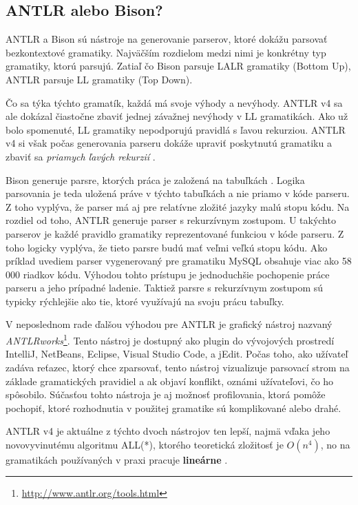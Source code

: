 \subsection{ANTLR alebo Bison?}
ANTLR a Bison sú nástroje na generovanie parserov, ktoré dokážu parsovať bezkontextové gramatiky. Najväčším rozdielom medzi nimi je konkrétny typ gramatiky, ktorú parsujú. Zatiaľ čo Bison parsuje LALR gramatiky (Bottom Up), ANTLR parsuje LL gramatiky (Top Down). 

Čo sa týka týchto gramatík, každá má svoje výhody a nevýhody. ANTLR v4 sa ale dokázal čiastočne zbaviť jednej závažnej nevýhody v LL gramatikách. Ako už bolo spomenuté, LL gramatiky nepodporujú pravidlá s ľavou rekurziou. ANTLR v4 si však počas generovania parseru dokáže upraviť poskytnutú gramatiku a zbaviť sa \textit{priamych ľavých rekurzií} \cite{ALL}.

Bison generuje parsre, ktorých práca je založená na tabuľkách \cite{IELR}. Logika parsovania je teda uložená práve v týchto tabuľkách a nie priamo v kóde parseru. Z toho vyplýva, že parser má aj pre relatívne zložité jazyky malú stopu kódu. Na rozdiel od toho, ANTLR generuje parser s rekurzívnym zostupom. U takýchto parserov je každé pravidlo gramatiky reprezentované funkciou v kóde parseru. Z toho logicky vyplýva, že tieto parsre budú mať veľmi veľkú stopu kódu. Ako príklad uvediem parser vygenerovaný pre gramatiku MySQL obsahuje viac ako 58 000 riadkov kódu. Výhodou tohto prístupu je jednoduchšie pochopenie práce parseru a jeho prípadné ladenie. Taktiež parsre s rekurzívnym zostupom sú typicky rýchlejšie ako tie, ktoré využívajú na svoju prácu tabuľky. 

V neposlednom rade ďalšou výhodou pre ANTLR je grafický nástroj nazvaný \textit{ANTLRworks}\footnote{\url{http://www.antlr.org/tools.html}}. Tento nástroj je dostupný ako plugin do vývojových prostredí IntelliJ, NetBeans, Eclipse, Visual Studio Code, a jEdit. Počas toho, ako užívateľ zadáva reťazec, ktorý chce zparsovať, tento nástroj vizualizuje parsovací strom na základe gramatických pravidiel a ak objaví konflikt, oznámi užívateľovi, čo ho spôsobilo. Súčasťou tohto nástroja je aj možnosť profilovania, ktorá pomôže pochopiť, ktoré rozhodnutia v použitej gramatike sú komplikované alebo drahé.

ANTLR v4 je aktuálne z týchto dvoch nástrojov ten lepší, najmä vďaka jeho novovyvinutému algoritmu ALL(*), ktorého teoretická zložitosť je $O(n^4)$, no na gramatikách používaných v praxi pracuje \textbf{lineárne} \cite{ALL}.

